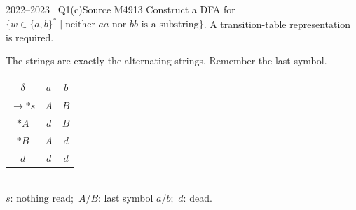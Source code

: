 \documentclass[11pt,a4paper]{article}
\begin{document}
\begin{question}{2022--2023 \textbullet\ Q1(c)}{Source M49}{13}
Construct a DFA for $\{w\in\{a,b\}^*\mid \text{neither } aa \text{ nor } bb \text{ is a substring}\}$. A transition-table representation is required.
\end{question}
\begin{solution}
The strings are exactly the alternating strings. Remember the last symbol.
\begin{center}
\begin{minipage}{.48\linewidth}\centering
{}\end{minipage}\hfill
\begin{minipage}{.44\linewidth}\centering\small
\begin{tabular}{c|cc}\toprule $\delta$ & $a$ & $b$\\\midrule
$\to *s$ & $A$ & $B$\\ $*A$ & $d$ & $B$\\ $*B$ & $A$ & $d$\\ $d$ & $d$ & $d$\\\bottomrule\end{tabular}\\[2mm]
\footnotesize $s$: nothing read;\ $A/B$: last symbol $a/b$;\ $d$: dead.
\end{minipage}\end{center}
\end{solution}
\end{document}
